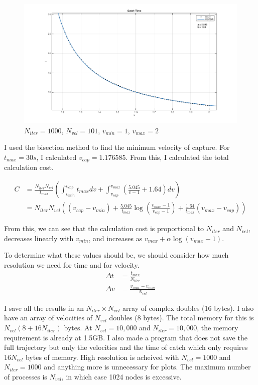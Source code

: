 \documentclass{article}
\begin{document}
\begin{figure}[H]
\includegraphics[width=\textwidth]{catch_time.png}
\caption{$N_{iter}=1000$, $N_{vel}=101$, $v_{min}=1$, $v_{max}=2$}
\end{figure}

I used the bisection method to find the minimum velocity of capture.
For $t_{max}=30 s$, I calculated $v_{cap}=1.176585$.
From this, I calculated the total calculation cost.

\begin{align*}
C &= \frac{N_{iter} N_{vel}}{t_{max}}
\left( 
  \int_{v_{min}}^{v_{cap}} t_{max} dv + 
  \int_{v_{cap}}^{v_{max}} (\frac{5.045}{v-1}+1.64)dv
\right) \\
&= N_{iter} N_{vel} \left(
(v_{cap}-v_{min}) + 
\frac{5.045}{t_{max}} \log \left( \frac{v_{max}-1}{v_{cap}-1} \right) + 
\frac{1.64}{t_{max}} (v_{max}-v_{cap})
\right)
\end{align*}

From this, we can see that the calculation cost is proportional to $N_{iter}$ and $N_{vel}$, decreases linearly with $v_{min}$, and increases as $v_{max}+\alpha \log(v_{max}-1)$.

To determine what these values should be, we should consider how much resolution we need for time and for velocity. 
\begin{align*}
\Delta t &= \frac{t_{max}}{N_{iter}} \\
\Delta v &=\frac{v_{max}-v_{min}}{N_{vel}}
\end{align*}

I save all the results in an $N_{iter} \times N_{vel}$ array of complex doubles (16 bytes).
I also have an array of velocities of $N_{vel}$ doubles (8 bytes). The total memory for this is $N_{vel}(8 + 16 N_{iter})$ bytes.
At $N_{vel}=10,000$ and $N_{iter}=10,000$, the memory requirement is already at 1.5GB.
I also made a program that does not save the full trajectory but only the velocities and the time of catch which only requires $16N_{vel}$ bytes of memory.
High resolution is acheived with $N_{vel}=1000$ and $N_{iter}=1000$ and anything more is unnecessary for plots.
The maximum number of processes is $N_{vel}$, in which case 1024 nodes is excessive.
\end{document}
